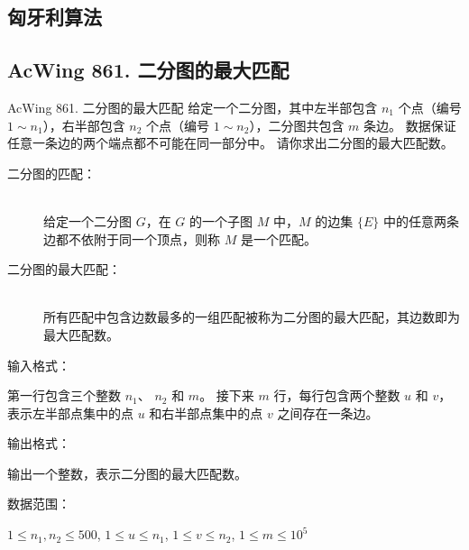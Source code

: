\subsection{匈牙利算法}

\subsection{AcWing 861. 二分图的最大匹配}

\begin{titledbox}{AcWing 861. 二分图的最大匹配}
    给定一个二分图，其中左半部包含 $n_1$ 个点（编号 $1 \sim n_1$），右半部包含 $n_2$ 个点（编号 $1 \sim n_2$），二分图共包含 $m$ 条边。 数据保证任意一条边的两个端点都不可能在同一部分中。 请你求出二分图的最大匹配数。

    \begin{description}
        \item [二分图的匹配：] \\
        给定一个二分图 $G$，在 $G$ 的一个子图 $M$ 中，$M$ 的边集 $\{E\}$ 中的任意两条边都不依附于同一个顶点，则称 $M$ 是一个匹配。
        \item [二分图的最大匹配：] \\
        所有匹配中包含边数最多的一组匹配被称为二分图的最大匹配，其边数即为最大匹配数。
    \end{description}

    输入格式：

    第一行包含三个整数 $n_1$、 $n_2$ 和 $m$。 接下来 $m$ 行，每行包含两个整数 $u$ 和 $v$，表示左半部点集中的点 $u$ 和右半部点集中的点 $v$ 之间存在一条边。

    输出格式：

    输出一个整数，表示二分图的最大匹配数。

    数据范围：

    $1 \le n_1,n_2 \le 500$, $1 \le u \le n_1$, $1 \le v \le n_2$, $1 \le m \le 10^5$

    \begin{inputblock}
         \\
         \\
         \\
         \\
    \end{inputblock}
    \begin{outputblock}
    \end{outputblock}
\end{titledbox}


